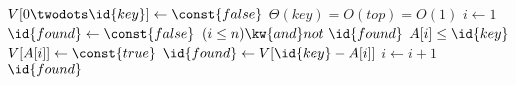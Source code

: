 \begin{codebox}
\li	$V[0 \twodots \id{key}] \leftarrow \const{false}$
		\Comment $\Theta (key) = O(top) = O(1)$
\li	$i \gets 1$
\li $\id{found} \gets \const{false}$
\li \While $(i \leq n) \kw{ and } not \ \id{found}$
\li 	\Do
			\If $A[i] \leq \id{key}$
\li				\Then
					$V[A[i]] \gets \const{true}$
\li					$\id{found} \gets V[\id{key} - A[i]]$
				\End
\li 		$i \gets i + 1$
		\End
\li	\Return $\id{found}$
\end{codebox}